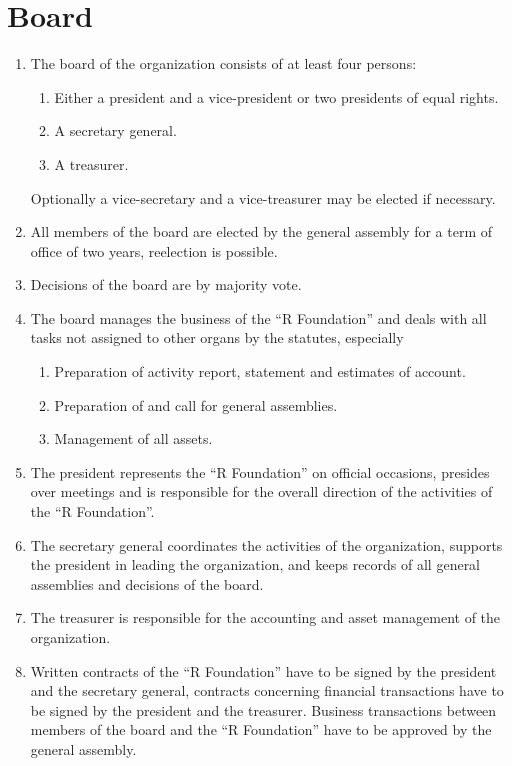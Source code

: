\documentclass[a4paper]{article}
\newcommand{\RF}{``R Foundation''}
\begin{document}
\section{Board}

\begin{enumerate}
  \item
   The board of the organization consists of at least four
   persons:
   \begin{enumerate}
    \item Either a president and a vice-president or two presidents of
     equal rights.
    \item A secretary general.
    \item A treasurer.
   \end{enumerate}
   Optionally a vice-secretary and a vice-treasurer may be elected if
   necessary.
   
  \item All members of the board are elected by the general assembly
   for a term of office of two years, reelection is possible.
   
  \item Decisions of the board are by majority vote.
   
  \item The board manages the business of the \RF{} and deals with all
   tasks not assigned to other organs by the statutes, especially
   \begin{enumerate}
    \item Preparation of activity report, statement and estimates of
     account. 
    \item Preparation of and call for general assemblies.
    \item Management of all assets.
  \end{enumerate}
  
 \item The president represents the \RF{} on official occasions,
  presides over meetings and is responsible for the overall direction
  of the activities of the \RF{}.
  
 \item The secretary general coordinates the activities of the
  organization, supports the president in leading the organization,
  and keeps records of all general assemblies and decisions of the
  board.
  
 \item The treasurer is responsible for the accounting and asset
  management of the organization.
  
 \item Written contracts of the \RF{} have to be signed by the
  president and the secretary general, contracts concerning financial
  transactions have to be signed by the president and the
  treasurer. Business transactions between members of the board and the
  \RF{} have to be approved by the general assembly.
\end{enumerate}
\end{document}

